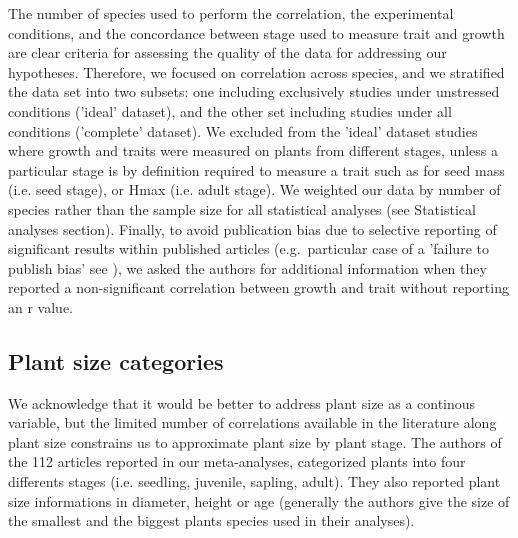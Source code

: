 \documentclass[a4paper]{article}\usepackage[]{graphicx}\usepackage[]{color}
\begin{document}
The number of species used to perform the correlation, the experimental conditions, and the concordance between stage used to measure trait and growth are clear criteria for assessing the quality of the data for addressing our hypotheses. Therefore, we focused on correlation across species, and we stratified the data set into two subsets: one including exclusively studies under unstressed conditions ('ideal' dataset), and the other set including studies under all conditions ('complete' dataset). We excluded from the 'ideal' dataset studies where growth and traits were measured on plants from different stages, unless a particular stage is by definition required to measure a trait such as for seed mass (i.e. seed stage), or Hmax (i.e. adult stage). We weighted our data by number of species rather than the sample size for all statistical analyses (see Statistical analyses section). Finally, to avoid publication bias due to selective reporting of significant results within published articles (e.g.~particular case of a 'failure to publish bias' see \citealt{Jennions:2013ta}), we asked the authors for additional information when they reported a non-significant correlation between growth and trait without reporting an r value.


\subsection*{Plant size categories}\label{plant-size-categories}

We acknowledge that it would be better to address plant size as a continous variable, but the limited number of correlations available in the literature along plant size constrains us to approximate plant size by plant stage. The authors of the 112 articles reported in our meta-analyses, categorized plants into four differents stages (i.e. seedling, juvenile, sapling, adult). They also reported plant size informations in diameter, height or age (generally the authors give the size of the smallest and the biggest plants species used in their analyses). 
\end{document}
